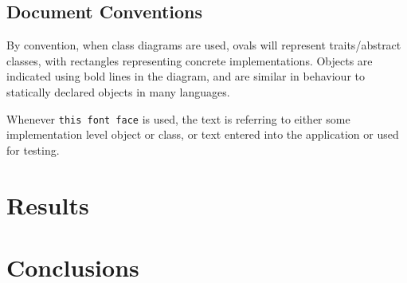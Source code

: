 \documentclass[10pt]{report}
\begin{document}
\section{Document Conventions}

By convention, when class diagrams are used, ovals will represent
traits/abstract classes, with rectangles representing concrete implementations.
Objects are indicated using bold lines in the diagram, and are similar
in behaviour to statically declared objects in many languages.

Whenever \texttt{this font face} is used, the text is referring to
either some implementation level object or class, or text entered into the application or used for testing.





\chapter{Results}

\chapter{Conclusions}

\printbibliography
\end{document}
